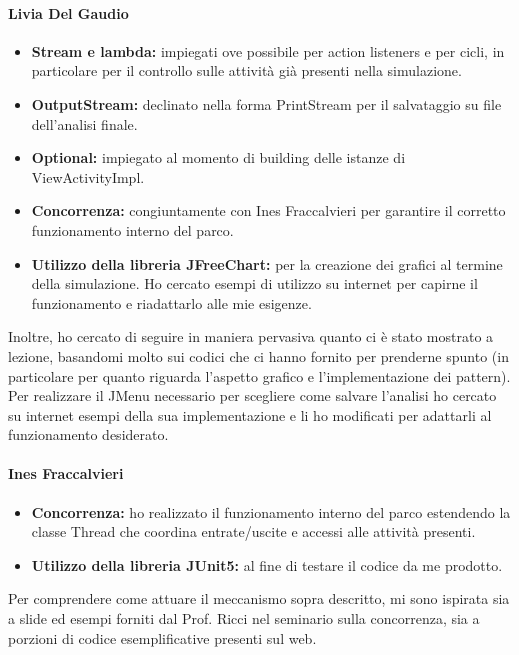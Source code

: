 \documentclass[a4paper,12pt]{report}
\begin{document}
\paragraph{Livia Del Gaudio}
\begin{itemize}
\item \textbf{Stream e lambda:} impiegati ove possibile per action listeners e per cicli, in particolare per il controllo sulle attività già presenti nella simulazione.
\item \textbf{OutputStream:} declinato nella forma PrintStream per il salvataggio su file dell'analisi finale. 
\item \textbf{Optional:} impiegato al momento di building delle istanze di ViewActivityImpl.
\item \textbf{Concorrenza:} congiuntamente con Ines Fraccalvieri per garantire il corretto funzionamento interno del parco.
\item \textbf{Utilizzo della libreria JFreeChart:} per la creazione dei grafici al termine della simulazione. Ho cercato esempi di utilizzo su internet per capirne il funzionamento e riadattarlo alle mie esigenze.
\end{itemize}

Inoltre, ho cercato di seguire in maniera pervasiva quanto ci è stato mostrato a lezione, basandomi molto sui codici che ci hanno fornito per prenderne spunto (in particolare per quanto riguarda l’aspetto grafico e l’implementazione dei pattern). Per realizzare il JMenu necessario per scegliere come salvare l'analisi ho cercato su internet esempi della sua implementazione e li ho modificati per adattarli al funzionamento desiderato.

\paragraph{Ines Fraccalvieri}
\begin{itemize}
\item \textbf{Concorrenza:} ho realizzato il funzionamento interno del parco estendendo la classe Thread che coordina entrate/uscite e accessi alle attività presenti.
\item \textbf{Utilizzo della libreria JUnit5:} al fine di testare il codice da me prodotto.
\end{itemize}

Per comprendere come attuare il meccanismo sopra descritto, mi sono ispirata sia a slide ed esempi forniti dal Prof. Ricci nel seminario sulla concorrenza, sia a porzioni di codice esemplificative presenti sul web.
\end{document}
